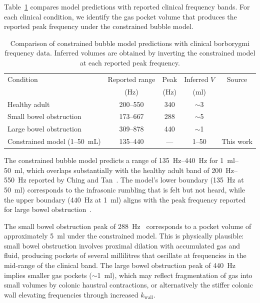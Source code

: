 \documentclass[review]{elsarticle}
\begin{document}
Table~\ref{tab:clinical} compares model predictions with reported clinical
frequency bands.  For each clinical condition, we identify the gas pocket
volume that produces the reported peak frequency under the constrained bubble
model.

\begin{table}[t]
\centering
\caption{Comparison of constrained bubble model predictions with clinical
  borborygmi frequency data.  Inferred volumes are obtained by inverting the
  constrained model at each reported peak frequency.}
\label{tab:clinical}
\begin{tabular}{lcccc}
\toprule
Condition & Reported range & Peak & Inferred $V$ & Source \\
 & (\si{\hertz}) & (\si{\hertz}) & (\si{\milli\litre}) & \\
\midrule
Healthy adult & 200--550 & 340 & $\sim$3 & \cite{Ching2012} \\
Small bowel obstruction & 173--667 & 288 & $\sim$5 & \cite{Yoshino1990} \\
Large bowel obstruction & 309--878 & 440 & $\sim$1 & \cite{DuPlessis2000} \\
\midrule
Constrained model (1--50~mL) & 135--440 & --- & 1--50 & This work \\
\bottomrule
\end{tabular}
\end{table}

The constrained bubble model predicts a range of
\SIrange{135}{440}{\hertz} for \SIrange{1}{50}{\milli\litre}, which
overlaps substantially with the healthy adult band of
\SIrange{200}{550}{\hertz} reported by Ching and Tan~\cite{Ching2012}.
The model's lower boundary (\SI{135}{\hertz} at \SI{50}{\milli\litre})
corresponds to the infrasonic rumbling that is felt but not heard, while the
upper boundary (\SI{440}{\hertz} at \SI{1}{\milli\litre}) aligns with the
peak frequency reported for large bowel obstruction~\cite{DuPlessis2000}.

The small bowel obstruction peak of \SI{288}{\hertz}~\cite{Yoshino1990}
corresponds to a pocket volume of approximately \SI{5}{\milli\litre} under
the constrained model.  This is physically plausible: small bowel obstruction
involves proximal dilation with accumulated gas and fluid, producing pockets
of several millilitres that oscillate at frequencies in the mid-range of the
clinical band.  The large bowel obstruction peak of
\SI{440}{\hertz}~\cite{DuPlessis2000} implies smaller gas pockets
($\sim$\SI{1}{\milli\litre}), which may reflect fragmentation of gas into
small volumes by colonic haustral contractions, or alternatively the stiffer
colonic wall elevating frequencies through increased $k_\mathrm{wall}$.
\end{document}
